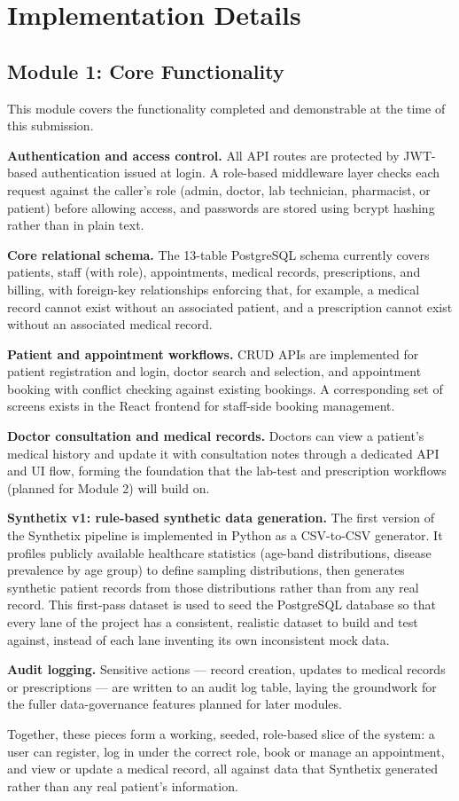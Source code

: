 \documentclass[12pt,a4paper]{report}
\begin{document}
\section{Implementation Details}

\subsection{Module 1: Core Functionality}

This module covers the functionality completed and demonstrable at the time of this submission.

\textbf{Authentication and access control.} All API routes are protected by JWT-based authentication issued at login. A role-based middleware layer checks each request against the caller's role (admin, doctor, lab technician, pharmacist, or patient) before allowing access, and passwords are stored using bcrypt hashing rather than in plain text.

\textbf{Core relational schema.} The 13-table PostgreSQL schema currently covers patients, staff (with role), appointments, medical records, prescriptions, and billing, with foreign-key relationships enforcing that, for example, a medical record cannot exist without an associated patient, and a prescription cannot exist without an associated medical record.

\textbf{Patient and appointment workflows.} CRUD APIs are implemented for patient registration and login, doctor search and selection, and appointment booking with conflict checking against existing bookings. A corresponding set of screens exists in the React frontend for staff-side booking management.

\textbf{Doctor consultation and medical records.} Doctors can view a patient's medical history and update it with consultation notes through a dedicated API and UI flow, forming the foundation that the lab-test and prescription workflows (planned for Module 2) will build on.

\textbf{Synthetix v1: rule-based synthetic data generation.} The first version of the Synthetix pipeline is implemented in Python as a CSV-to-CSV generator. It profiles publicly available healthcare statistics (age-band distributions, disease prevalence by age group) to define sampling distributions, then generates synthetic patient records from those distributions rather than from any real record. This first-pass dataset is used to seed the PostgreSQL database so that every lane of the project has a consistent, realistic dataset to build and test against, instead of each lane inventing its own inconsistent mock data.

\textbf{Audit logging.} Sensitive actions --- record creation, updates to medical records or prescriptions --- are written to an audit log table, laying the groundwork for the fuller data-governance features planned for later modules.

Together, these pieces form a working, seeded, role-based slice of the system: a user can register, log in under the correct role, book or manage an appointment, and view or update a medical record, all against data that Synthetix generated rather than any real patient's information.
\end{document}
